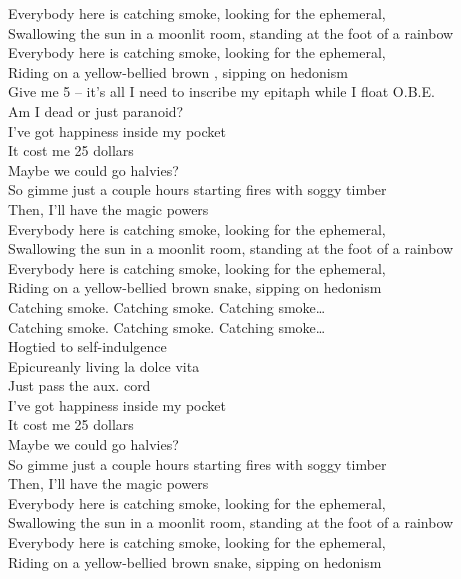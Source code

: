 Everybody here is catching smoke, looking for the ephemeral, \\
Swallowing the sun in a moonlit room, standing at the foot of a rainbow \\
Everybody here is catching smoke, looking for the ephemeral, \\
Riding on a yellow-bellied brown , sipping on hedonism \\

Give me 5 -- it's all I need to inscribe my epitaph while I float O.B.E. \\
Am I dead or just paranoid? \\

I've got happiness inside my pocket \\
It cost me 25 dollars \\
Maybe we could go halvies? \\
So gimme just a couple hours starting fires with soggy timber \\
Then, I'll have the magic powers \\

Everybody here is catching smoke, looking for the ephemeral, \\
Swallowing the sun in a moonlit room, standing at the foot of a rainbow \\
Everybody here is catching smoke, looking for the ephemeral, \\
Riding on a yellow-bellied brown snake, sipping on hedonism \\

Catching smoke. Catching smoke. Catching smoke… \\
Catching smoke. Catching smoke. Catching smoke… \\

Hogtied to self-indulgence \\
Epicureanly living la dolce vita \\
Just pass the aux. cord \\

I've got happiness inside my pocket \\
It cost me 25 dollars \\
Maybe we could go halvies? \\
So gimme just a couple hours starting fires with soggy timber \\
Then, I'll have the magic powers \\

Everybody here is catching smoke, looking for the ephemeral, \\
Swallowing the sun in a moonlit room, standing at the foot of a rainbow \\
Everybody here is catching smoke, looking for the ephemeral, \\
Riding on a yellow-bellied brown snake, sipping on hedonism \\

